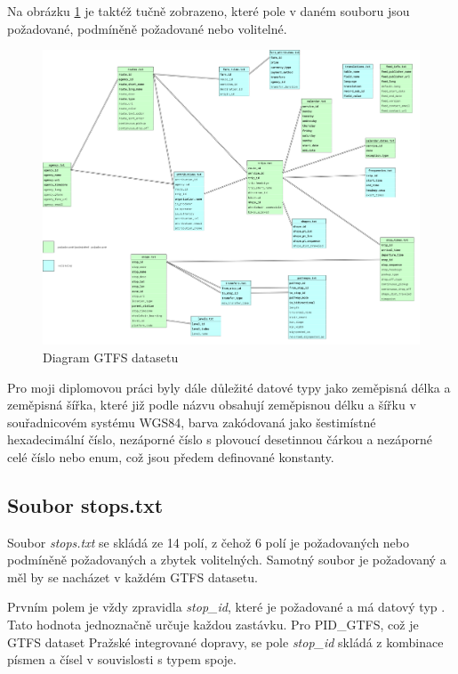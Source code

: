 Na obrázku \ref{fig:GTFS-diagram} je taktéž tučně zobrazeno, které pole v daném  souboru
jsou požadované, podmíněně požadované nebo volitelné.  

\begin{figure}[H] \centering
    \includegraphics[width=400pt]{./pictures/GTFS-diagram.PNG}
    \caption[Diagram GTFS datasetu]{Diagram GTFS datasetu}
	\label{fig:GTFS-diagram}              
\end{figure}

Pro moji diplomovou práci byly dále důležité datové typy jako zeměpisná délka a zeměpisná šířka,
které již podle názvu obsahují zeměpisnou délku a šířku v souřadnicovém systému WGS84, barva zakódovaná 
jako šestimístné hexadecimální číslo, nezáporné číslo s plovoucí desetinnou čárkou a nezáporné celé číslo
nebo enum, což jsou předem definované konstanty.

\subsection{Soubor stops.txt}
\label{stops.txt}
Soubor \textit{stops.txt} se skládá ze 14 polí, z čehož 6 polí je požadovaných nebo podmíněně požadovaných 
a zbytek volitelných. Samotný soubor je požadovaný a měl by se nacházet v každém GTFS datasetu.

Prvním polem je vždy zpravidla \textit{stop\_id}, které je požadované a má datový typ .
Tato hodnota jednoznačně určuje každou zastávku. Pro PID\_GTFS, což je GTFS dataset Pražské integrované dopravy,
se pole \textit{stop\_id} skládá z kombinace písmen a čísel v souvislosti s typem spoje.


